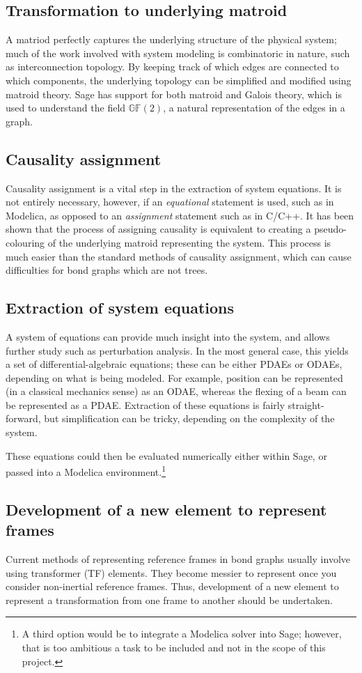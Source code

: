 \documentclass[utf8,a4paper,12pt]{report}
\begin{document}
\subsection{Transformation to underlying matroid}
A matriod perfectly captures the underlying structure of the physical system; much of the work involved with system modeling is combinatoric in nature, such as interconnection topology. By keeping track of which edges are connected to which components, the underlying topology can be simplified and modified using matroid theory. Sage has support for both matroid and Galois theory, which is used to understand the field $\mathbb{GF}(2)$, a natural representation of the edges in a graph.
\subsection{Causality assignment}
Causality assignment is a vital step in the extraction of system equations.  It is not entirely necessary, however, if an \emph{equational} statement is used, such as in Modelica, as opposed to an \emph{assignment} statement such as in C/C++. It has been shown that the process of assigning causality is equivalent to creating a pseudo-colouring of the underlying matroid representing the system. This process is much easier than the standard methods of causality assignment, which can cause difficulties for bond graphs which are not trees.
\subsection{Extraction of system equations}
A system of equations can provide much insight into the system, and allows further study such as perturbation analysis. In the most general case, this yields a set of differential-algebraic equations; these can be either PDAEs or ODAEs, depending on what is being modeled. For example, position can be represented (in a classical mechanics sense) as an ODAE, whereas the flexing of a beam can be represented as a PDAE. Extraction of these equations is fairly straight-forward, but simplification can be tricky, depending on the complexity of the system.

These equations could then be evaluated numerically either within Sage, or passed into a Modelica environment.\footnote{A third option would be to integrate a Modelica solver into Sage; however, that is too ambitious a task to be included and not in the scope of this project.}
\subsection{Development of a new element to represent frames}
Current methods of representing reference frames in bond graphs usually involve using transformer (TF) elements. They become messier to represent once you consider non-inertial reference frames. Thus, development of a new element to represent a transformation from one frame to another should be undertaken.
\end{document}

